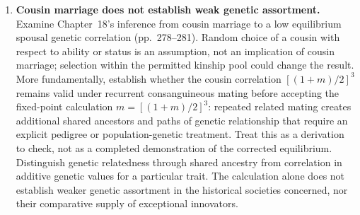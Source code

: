 \documentclass[12pt]{article}
\renewenvironment{itemize}{\begin{enumerate}}{\end{enumerate}}
\begin{document}
\begin{itemize}
\item \textbf{Cousin marriage does not establish weak genetic assortment.}
Examine Chapter~18's inference from cousin marriage to a low equilibrium
spousal genetic correlation (pp.~278--281). Random choice of a cousin
with respect to ability or status is an assumption, not an implication
of cousin marriage; selection within the permitted kinship pool could
change the result. More fundamentally, establish whether the cousin
correlation $[(1+m)/2]^3$ remains valid under recurrent consanguineous
mating before accepting the fixed-point calculation
$m=[(1+m)/2]^3$: repeated related mating creates additional shared
ancestors and paths of genetic relationship that require an explicit
pedigree or population-genetic treatment. Treat this as a derivation to
check, not as a completed demonstration of the corrected equilibrium.
Distinguish genetic relatedness through shared ancestry from correlation
in additive genetic values for a particular trait. The calculation alone
does not establish weaker genetic assortment in the historical societies
concerned, nor their comparative supply of exceptional innovators.

\end{itemize}
\end{document}
